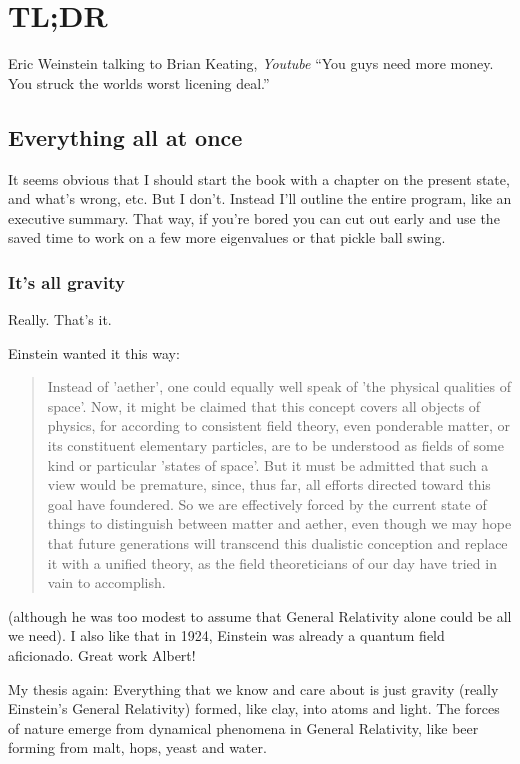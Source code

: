 \documentclass[../rzero]{subfiles}
\begin{document}
\chapter{TL;DR}\label{introChapter}

\begin{chapquote}{Eric Weinstein talking to Brian Keating, \textit{Youtube\cite{drbriankeatingEricWeinsteinTheoretical2020}}}
``You guys need more money. You struck the worlds worst licening deal.''
\end{chapquote}


\section{Everything all at once}
It seems obvious that I should start the book with a chapter on the present state, and what's wrong, etc. But I don't. Instead I'll outline the entire program, like an executive summary. That way, if you're bored you can cut out early and use the saved time to work on a few more eigenvalues or that pickle ball swing. 

\subsection{It's all gravity}
	Really. That's it. 

Einstein wanted it this way:\cite{einstein1924concerning} 
\begin{quotation}
	 Instead of 'aether', one could equally well speak of 'the physical qualities of space'. Now, it might be claimed that this concept covers all objects of physics, for according to consistent field theory, even ponderable matter, or its constituent elementary particles, are to be understood as fields of some kind or particular 'states of space'. But it must be admitted that such a view would be premature, since, thus far, all efforts directed toward this goal have foundered. So we are effectively forced by the current state of things to distinguish between matter and aether, even though we may hope that future generations will transcend this dualistic conception and replace it with a unified theory, as the field theoreticians of our day have tried in vain to accomplish.
\end{quotation}
(although he was too modest to assume that General Relativity alone could be all we need). I also like that in 1924, Einstein was already a quantum field aficionado. Great work Albert!
	
	My thesis again: Everything that we know and care about is just gravity (really Einstein's General Relativity) formed, like clay, into atoms and light. The forces of nature emerge from dynamical phenomena in General Relativity, like beer forming from malt, hops, yeast and water. 
	
\end{document}
